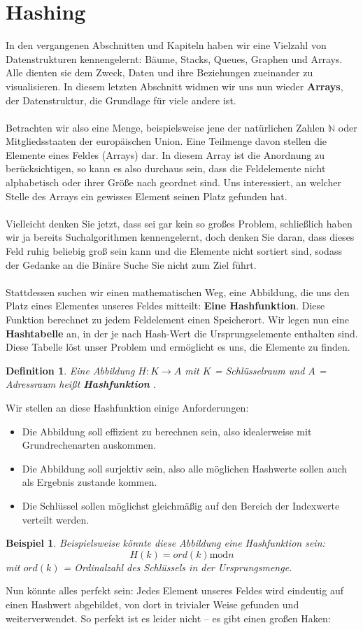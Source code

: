 \documentclass[11pt,a4paper]{scrartcl}
\newtheorem{definition}{Definition}
\newtheorem{example}{Beispiel}
\begin{document}
\part{Hashing}
In den vergangenen Abschnitten und Kapiteln haben wir eine Vielzahl von Datenstrukturen kennengelernt: Bäume, Stacks, Queues, Graphen und Arrays. Alle dienten sie dem Zweck, Daten und ihre Beziehungen zueinander zu visualisieren. In diesem letzten Abschnitt widmen wir uns nun wieder \textbf{Arrays}, der Datenstruktur, die Grundlage für viele andere ist. \\\\
Betrachten wir also eine Menge, beispielsweise jene der natürlichen Zahlen $\mathbb{N}$ oder Mitgliedsstaaten der europäischen Union. Eine Teilmenge davon stellen die Elemente eines Feldes (Arrays) dar. In diesem Array ist die Anordnung zu berücksichtigen, so kann es also durchaus sein, dass die Feldelemente nicht alphabetisch oder ihrer Größe nach geordnet sind. Uns interessiert, an welcher Stelle des Arrays ein gewisses Element seinen Platz gefunden hat. \\\\
Vielleicht denken Sie jetzt, dass sei gar kein so großes Problem, schließlich haben wir ja bereits Suchalgorithmen kennengelernt, doch denken Sie daran, dass dieses Feld ruhig beliebig groß sein kann und die Elemente nicht sortiert sind, sodass der Gedanke an die Binäre Suche Sie nicht zum Ziel führt. \\\\
Stattdessen suchen wir einen mathematischen Weg, eine Abbildung, die uns den Platz eines Elementes unseres Feldes mitteilt: \textbf{Eine Hashfunktion}. Diese Funktion berechnet zu jedem Feldelement einen Speicherort. Wir legen nun eine \textbf{Hashtabelle} an, in der je nach Hash-Wert die Ursprungselemente enthalten sind. Diese Tabelle löst unser Problem und ermöglicht es uns, die Elemente zu finden.
\begin{definition}
Eine Abbildung $H: K \to A$ mit $K$ = Schlüsselraum und $A$ = Adressraum heißt \textbf{Hashfunktion} \parencite[][S. 296]{Wirth}.
\end{definition}
Wir stellen an diese Hashfunktion einige Anforderungen:
\begin{itemize}
\item Die Abbildung soll effizient zu berechnen sein, also idealerweise mit Grundrechenarten auskommen.
\item Die Abbildung soll surjektiv sein, also alle möglichen Hashwerte sollen auch als Ergebnis zustande kommen.
\item Die Schlüssel sollen möglichst gleichmäßig auf den Bereich der Indexwerte verteilt werden.
\end{itemize}
\begin{example}
Beispielsweise könnte diese Abbildung eine Hashfunktion sein:
\[H(k) = ord(k) \text{mod} n\] mit $ord(k)$ = Ordinalzahl des Schlüssels in der Ursprungsmenge.
\end{example}
Nun könnte alles perfekt sein: Jedes Element unseres Feldes wird eindeutig auf einen Hashwert abgebildet, von dort in trivialer Weise gefunden und weiterverwendet. So perfekt ist es leider nicht -- es gibt einen großen Haken:
\end{document}
